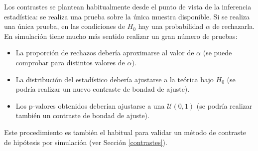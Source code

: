 \documentclass[
]{book}
\theoremstyle{break}
\theoremstyle{nonumberplain}
\begin{document}
Los contrastes se plantean habitualmente desde el punto de vista de la inferencia estadística: se realiza una prueba sobre la única muestra disponible.
Si se realiza una única prueba, en las condiciones de \(H_0\) hay una probabilidad \(\alpha\) de rechazarla.
En simulación tiene mucho más sentido realizar un gran número de pruebas:

\begin{itemize}
\item
  La proporción de rechazos debería aproximarse al valor de
  \(\alpha\) (se puede comprobar para distintos valores de \(\alpha\)).
\item
  La distribución del estadístico debería ajustarse a la teórica
  bajo \(H_0\) (se podría realizar un nuevo contraste de bondad
  de ajuste).
\item
  Los p-valores obtenidos deberían ajustarse a una
  \(\mathcal{U}\left(0,1\right)\) (se podría realizar también un
  contraste de bondad de ajuste).
\end{itemize}

Este procedimiento es también el habitual para validar un método de
contraste de hipótesis por simulación (ver Sección \ref{contrastes}).
\end{document}
